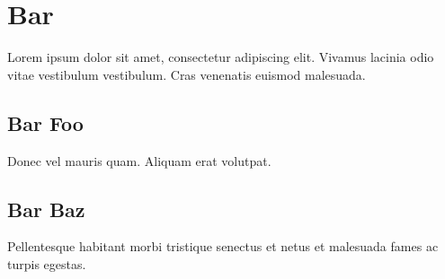 \part{Bar}\label{bar}

Lorem ipsum dolor sit amet, consectetur adipiscing elit. Vivamus lacinia odio vitae vestibulum vestibulum. Cras venenatis euismod malesuada.

\chapter{Bar Foo}\label{bar-foo}

Donec vel mauris quam. Aliquam erat volutpat.

\chapter{Bar Baz}\label{bar-baz}

Pellentesque habitant morbi tristique senectus et netus et malesuada fames ac turpis egestas.

